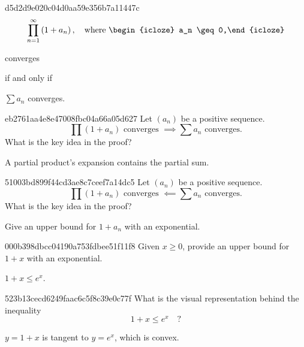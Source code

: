\begin{note}{d5d2d9e020c04d0aa59e356b7a11447c}
    \[
        \prod_{n = 1}^{\infty} \left( 1 + a_n \right), \quad \text{where } \begin{icloze}{2}a_n \geq 0,\end{icloze}
    \]
    \begin{icloze}{3}converges\end{icloze} if and only if \begin{icloze}{1}\({ \sum a_n }\) converges.\end{icloze}
\end{note}

\begin{note}{eb2761aa4e8e47008fbc04a66a05d627}
    Let \({ (a_n) }\) be a positive sequence.
    \[
        \prod \left( 1 + a_n \right) \text{ converges } \implies \sum a_n \text{ converges.}
    \]
    What is the key idea in the proof?

    \begin{cloze}{1}
        A partial product's expansion contains the partial sum.
    \end{cloze}
\end{note}

\begin{note}{51003bd899f44cd3ae8c7ceef7a14dc5}
    Let \({ (a_n) }\) be a positive sequence.
    \[
        \prod \left( 1 + a_n \right) \text{ converges } \impliedby \sum a_n \text{ converges.}
    \]
    What is the key idea in the proof?

    \begin{cloze}{1}
        Give an upper bound for \({ 1 + a_n }\) with an exponential.
    \end{cloze}
\end{note}

\begin{note}{000b398dbcc04190a753fdbee51f11f8}
    Given \({ x \geq 0 }\), provide an upper bound for \({ 1 + x }\) with an exponential.

    \begin{cloze}{1}
        \({ 1 + x \leq e^{x} }\).
    \end{cloze}
\end{note}

\begin{note}{523b13cecd6249faac6c5f8c39e0c77f}
    What is the visual representation behind the inequality
    \[
        1 + x \leq e^{x} \quad \text{?}
    \]

    \begin{cloze}{1}
        \({ y = 1 + x }\) is tangent to \({ y = e^{x} }\), which is convex.
    \end{cloze}
\end{note}

